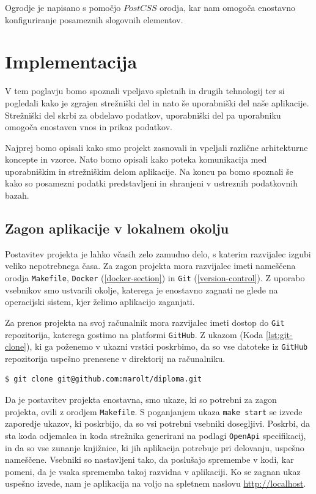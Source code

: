 Ogrodje je napisano s pomočjo $PostCSS$ orodja, kar nam omogoča enostavno konfiguriranje posameznih slogovnih elementov.

\chapter{Implementacija}
V tem poglavju bomo spoznali vpeljavo spletnih in drugih tehnologij ter si pogledali kako je zgrajen strežniški del in nato še uporabniški del naše aplikacije. Strežniški del skrbi za obdelavo podatkov, uporabniški del pa uporabniku omogoča enostaven vnos in prikaz podatkov.

Najprej bomo opisali kako smo projekt zasnovali in vpeljali različne arhitekturne koncepte in vzorce. Nato bomo opisali kako poteka komunikacija med uporabniškim in strežniškim delom aplikacije. Na koncu pa bomo spoznali še kako so posamezni podatki predstavljeni in shranjeni v ustreznih podatkovnih bazah.

\section{Zagon aplikacije v lokalnem okolju}
Postavitev projekta je lahko včasih zelo zamudno delo, s katerim razvijalec izgubi veliko nepotrebnega časa. Za zagon projekta mora razvijalec imeti nameščena orodja \verb=Makefile=, \verb=Docker= (\ref{docker-section}) in \verb=Git= (\ref{version-control}). Z uporabo vsebnikov smo ustvarili okolje, katerega je enostavno zagnati ne glede na operacijski sistem, kjer želimo aplikacijo zaganjati.

Za prenos projekta na svoj računalnik mora razvijalec imeti dostop do \verb=Git= repozitorija, katerega gostimo na platformi \verb=GitHub=. Z ukazom (Koda \ref{lst:git-clone}), ki ga poženemo v ukazni vrstici poskrbimo, da so vse datoteke iz \verb=GitHub= repozitorija uspešno prenesene v direktorij na računalniku.

\begin{lstlisting}[language=bash,style=mystyle,caption={Ukaz za prenos datotek iz GitHub repozitorija.},label=lst:git-clone]
$ git clone git@github.com:marolt/diploma.git
\end{lstlisting}

Da je postavitev projekta enostavna, smo ukaze, ki so potrebni za zagon projekta, ovili z orodjem \verb=Makefile=. S poganjanjem ukaza \verb=make start= se izvede zaporedje ukazov, ki poskrbijo, da so vsi potrebni vsebniki dosegljivi. Poskrbi, da sta koda odjemalca in koda strežnika generirani na podlagi \verb=OpenApi= specifikacij, in da so vse zunanje knjižnice, ki jih aplikacija potrebuje pri delovanju, uspešno nameščene. Vsebniki so nastavljeni tako, da poslušajo spremembe v kodi, kar pomeni, da je vsaka sprememba takoj razvidna v aplikaciji. Ko se zagnan ukaz uspešno izvede, nam je aplikacija na voljo na spletnem naslovu \url{http://localhost}.


